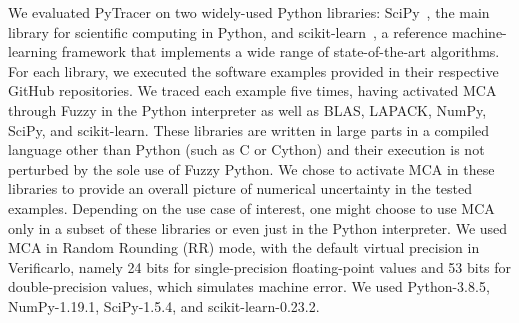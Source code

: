 \documentclass[10pt,journal,compsoc]{IEEEtran}
\newcommand{\pytracer}[0]{PyTracer\xspace}
\DeclareRobustCommand{\add}[1]{\textcolor{ao(english)}{#1}}%
\DeclareRobustCommand{\add}[1]{#1}
\begin{document}
We evaluated \pytracer on two widely-used Python libraries:
SciPy~\cite{virtanen2020scipy}, the main library for scientific computing in
Python, and  scikit-learn~\cite{pedregosa2011scikit}, a reference
machine-learning framework that implements a wide range of state-of-the-art
algorithms. For each library, we executed the software examples provided in
their respective GitHub repositories. We traced each example five times, having
activated MCA through Fuzzy in the Python interpreter \add{as well as} BLAS, LAPACK, NumPy,
SciPy, and scikit-learn. \add{These libraries are written in large parts in a
    compiled language other than Python (such as C or Cython) and their execution is not 
    perturbed by the sole use of Fuzzy Python. We chose to activate MCA in these libraries 
    to provide an overall picture of numerical uncertainty in the tested examples. 
    Depending on the use case of interest, one might choose to use MCA only in 
    a subset of these libraries or even just in the Python interpreter.} \add{We
    used MCA in Random Rounding (RR) mode, with} the default virtual
precision in Verificarlo, namely 24 bits for single-precision floating-point
values and 53 bits for double-precision values, which simulates machine error.
We used Python-3.8.5, NumPy-1.19.1, SciPy-1.5.4, and scikit-learn-0.23.2.
\end{document}
